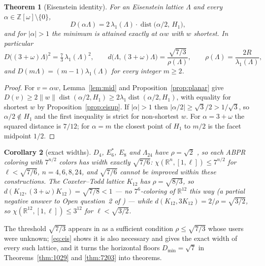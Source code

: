 \documentclass[10pt]{article}
\theoremstyle{plain}
\newtheorem{theorem}{Theorem}[section]
\newtheorem{corollary}[theorem]{Corollary}
\theoremstyle{remark}
\newcommand{\R}{\mathbb{R}}
\newcommand{\Z}{\mathbb{Z}}
\newcommand{\dist}{\operatorname{dist}}
\begin{document}
\begin{theorem}[Eisenstein identity]\label{thm:eis}
For an Eisenstein lattice $\Lambda$ and every
$\alpha\in\Z[\omega]\setminus\{0\}$,
\begin{equation}\label{eq:alpha}
D(\alpha\Lambda)=2\,\lambda_1(\Lambda)\cdot\dist\bigl(\alpha/2,\,H_1\bigr),
\end{equation}
and for $|\alpha|>1$ the minimum is attained exactly at $\alpha w$ with $w$
shortest. In particular
\begin{equation}\label{eq:eis}
D\bigl((3+\omega)\Lambda\bigr)^2=\tfrac73\,\lambda_1(\Lambda)^2,\qquad
d\bigl(\Lambda,(3+\omega)\Lambda\bigr)=\frac{\sqrt{7/3}}{\rho(\Lambda)},
\qquad\rho(\Lambda)=\frac{2R}{\lambda_1(\Lambda)},
\end{equation}
and $D(m\Lambda)=(m-1)\lambda_1(\Lambda)$ for every integer $m\ge2$.
\end{theorem}

\begin{proof}
For $v=\alpha w$, Lemma~\ref{lem:mid} and Proposition~\ref{prop:planar} give
$D(v)\ge2\|w\|\dist(\alpha/2,H_1)\ge2\lambda_1\dist(\alpha/2,H_1)$, with
equality for shortest $w$ by Proposition~\ref{prop:eisup}. If $|\alpha|>1$
then $|\alpha/2|\ge\sqrt3/2>1/\sqrt3$, so $\alpha/2\notin H_1$ and the first
inequality is strict for non-shortest $w$. For $\alpha=3+\omega$ the squared
distance is $7/12$; for $\alpha=m$ the closest point of $H_1$ to $m/2$ is
the facet midpoint $1/2$.
\end{proof}

\begin{corollary}[exact widths]\label{cor:widths}
$D_4$, $E_6^*$, $E_8$ and $\Lambda_{24}$ have $\rho=\sqrt2$
\cite{ConwaySloane}, so each ABPR coloring with $7^{n/2}$ colors has width
exactly $\sqrt{7/6}$: $\chi(\R^n,[1,\ell])\le7^{n/2}$ for $\ell<\sqrt{7/6}$,
$n=4,6,8,24$, and $\sqrt{7/6}$ cannot be improved within these
constructions. The Coxeter--Todd lattice $K_{12}$ has $\rho=\sqrt{8/3}$, so
$d(K_{12},(3+\omega)K_{12})=\sqrt{7/8}<1$ --- no $7^6$-coloring of $\R^{12}$
this way (a partial negative answer to Open question~2 of \cite{ABPR}) ---
while $d(K_{12},3K_{12})=2/\rho=\sqrt{3/2}$, so $\chi(\R^{12},[1,\ell])\le3^{12}$
for $\ell<\sqrt{3/2}$.
\end{corollary}

The threshold $\sqrt{7/3}$ appears in \cite[Remark~9]{ABPR} as a sufficient
condition $\rho\le\sqrt{7/3}$ whose users were unknown; \eqref{eq:eis} shows
it is also necessary and gives the exact width of every such lattice, and it
turns the horizontal floors $D_{\min}=\sqrt7$ in Theorems~\ref{thm:1029} and
\ref{thm:7203} into theorems.
\end{document}
